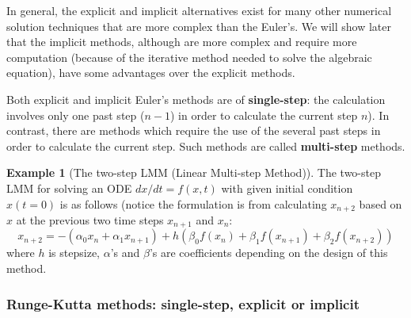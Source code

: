 \documentclass[a4paper,11pt]{article}
\theoremstyle{definition}
\newtheorem{exmp}{Example}[section]
\begin{document}
In general, the explicit and implicit alternatives exist for many other numerical solution techniques that
are more complex than the Euler’s. We will show later that the implicit methods, although are more complex
and require more computation (because of the iterative method needed to solve the algebraic equation),
have some advantages over the explicit methods.

Both explicit and implicit Euler's methods are of \textbf{single-step}: the calculation involves only one
past step ($n-1$) in order to calculate the current step $n$). In contrast, there are methods which require
the use of the several past steps in order to calculate the current step. Such methods are called 
\textbf{multi-step} methods.

\begin{exmp}[The two-step LMM (Linear Multi-step Method)]
\label{exmp:lmm}
The two-step LMM for solving an ODE $dx / dt = f(x, t)$ with given initial condition $x(t=0)$
is as follows (notice the formulation is from calculating $x_{n+2}$ based on $x$ at the previous two
time steps $x_{n+1}$ and $x_n$:
\begin{equation} \label{eq:lmm}
	x_{n+2} = - ( \alpha_0 x_n + \alpha_1 x_{n+1}) 
		+ h \left( \beta_0 f(x_n) + \beta_1 f(x_{n+1}) + \beta_2 f(x_{n+2}) \right)
\end{equation}
\noindent where $h$ is stepsize, $\alpha$'s and $\beta$'s are coefficients depending on the design of this method.

\end{exmp}

\subsubsection*{Runge-Kutta methods: single-step, explicit or implicit}
\end{document}
